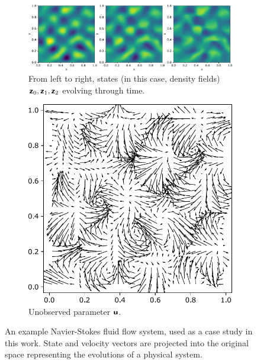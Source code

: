\documentclass{article}
\theoremstyle{plain}
\theoremstyle{definition}
\theoremstyle{remark}
\begin{document}
\begin{figure}[h!t]
     \centering
    \begin{subfigure}{0.7\textwidth}
        \centering
        \includegraphics[scale=0.35]{ns_p_trim.pdf}
         \caption{From left to right, states (in this case, density fields) $\boldsymbol{\mathsf{z}}_{0}, \boldsymbol{\mathsf{z}}_{1}, \boldsymbol{\mathsf{z}}_{2}$ evolving through time.}
         \label{fig:states}
     \end{subfigure}
     \begin{subfigure}{0.25\textwidth}
         \centering
        \includegraphics[scale=0.25]{ns_force_trim.pdf}
         \caption{Unobserved parameter $\boldsymbol{\mathsf{u}}$.}
         \label{fig:forcing}
     \end{subfigure}
     \hfill
    \centering
    \caption{An example Navier-Stokes fluid flow system, used as a case study in this work. State and velocity vectors are projected into the original space representing the evolutions of a physical system.}
    \label{fig:dynamicalsystem}
\end{figure}
\end{document}
